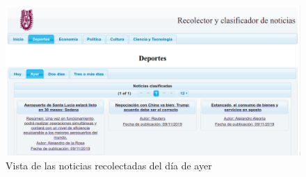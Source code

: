 \begin{figure}[H]
\centering
\includegraphics[scale=0.29]{imagenes/Capitulo5/noticiasDeAyer.png}
\caption{Vista de las noticias recolectadas del día de ayer}
\label{fig:vistaNoticiasAyer}
\end{figure}
